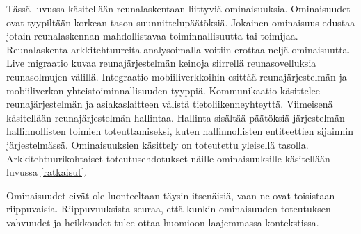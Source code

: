 \documentclass[finnish]{tktltiki2}
\theoremstyle{definition}
\theoremstyle{remark}
\begin{document}
Tässä luvussa käsitellään reunalaskentaan liittyviä ominaisuuksia.
Ominaisuudet ovat tyypiltään korkean tason suunnittelupäätöksiä. 
Jokainen ominaisuus edustaa jotain reunalaskennan mahdollistavaa toiminnallisuutta tai toimijaa.
Reunalaskenta-arkkitehtuureita analysoimalla voitiin erottaa neljä ominaisuutta.
Live migraatio kuvaa reunajärjestelmän keinoja siirrellä reunasovelluksia reunasolmujen välillä.
Integraatio mobiiliverkkoihin esittää reunajärjestelmän ja mobiiliverkon yhteistoiminnallisuuden tyyppiä. 
Kommunikaatio käsittelee reunajärjestelmän ja asiakaslaitteen välistä tietoliikenneyhteyttä. 
Viimeisenä käsitellään reunajärjestelmän hallintaa. Hallinta sisältää päätöksiä järjestelmän hallinnollisten toimien toteuttamiseksi, kuten hallinnollisten entiteettien sijainnin järjestelmässä.
Ominaisuuksien käsittely on toteutettu yleisellä tasolla.
Arkkitehtuurikohtaiset toteutusehdotukset näille ominaisuuksille käsitellään luvussa \ref{ratkaisut}.

Ominaisuudet eivät ole luonteeltaan täysin itsenäisiä, vaan ne ovat toisistaan riippuvaisia. Riippuvuuksista seuraa, että kunkin ominaisuuden toteutuksen vahvuudet ja heikkoudet tulee ottaa huomioon laajemmassa kontekstissa. 
\end{document}
